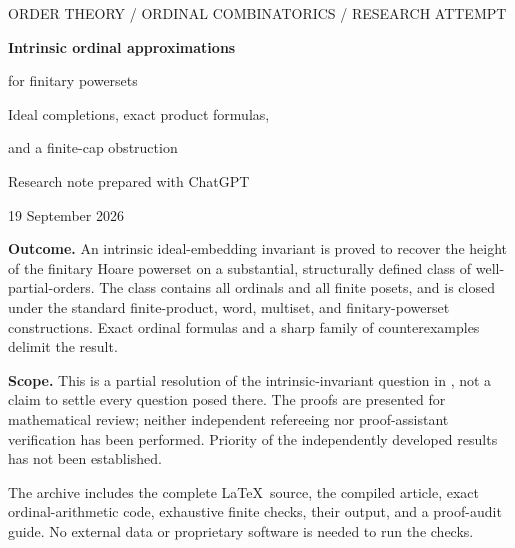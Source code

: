 \documentclass[11pt,letterpaper]{article}
\theoremstyle{teal}
\theoremstyle{definition}
\begin{document}
\hypersetup{pageanchor=false}
\begin{titlepage}
\vspace*{.7in}
{\sffamily\small\color{DeepTeal}\MakeUppercase{Order theory / ordinal combinatorics / research attempt}\par}
\vspace{.35in}
{\fontsize{29}{35}\selectfont\bfseries\color{Ink}Intrinsic ordinal approximations\par for finitary powersets\par}
\vspace{.25in}
{\Large\color{Muted}Ideal completions, exact product formulas,\par and a finite-cap obstruction\par}
\vspace{.5in}
{\large Research note prepared with ChatGPT\par}
{19 September 2026\par}
\vspace{.45in}
\begin{resultbox}
\textbf{Outcome.} An intrinsic ideal-embedding invariant is proved to recover the height of the finitary Hoare powerset on a substantial, structurally defined class of well-partial-orders. The class contains all ordinals and all finite posets, and is closed under the standard finite-product, word, multiset, and finitary-powerset constructions. Exact ordinal formulas and a sharp family of counterexamples delimit the result.

\textbf{Scope.} This is a partial resolution of the intrinsic-invariant question in \cite[Section~6]{AHLLSSV}, not a claim to settle every question posed there. The proofs are presented for mathematical review; neither independent refereeing nor proof-assistant verification has been performed. Priority of the independently developed results has not been established.
\end{resultbox}
\vfill
{\small\color{Muted}The archive includes the complete \LaTeX\ source, the compiled article, exact ordinal-arithmetic code, exhaustive finite checks, their output, and a proof-audit guide. No external data or proprietary software is needed to run the checks.}
\end{titlepage}
\hypersetup{pageanchor=true}
\end{document}
